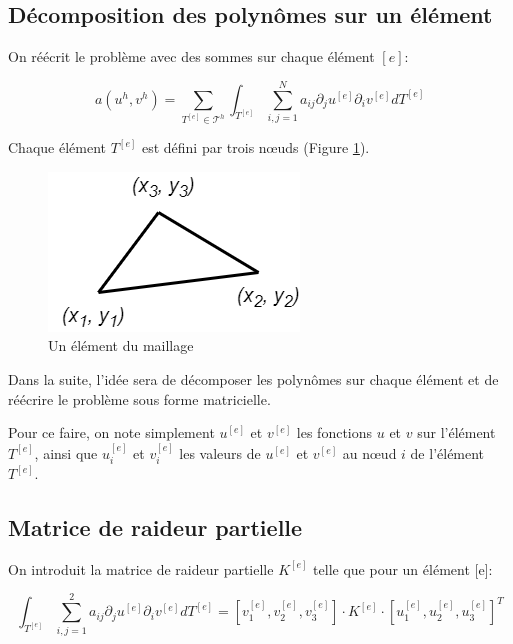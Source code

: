 \documentclass{article}
\begin{document}
\newpage

\subsection{Décomposition des polynômes sur un élément}

On réécrit le problème avec des sommes sur chaque élément $[e]$:

\begin{equation}
    a(u^h, v^h) = \sum_{T^{[e]} \in \mathcal{T}^h} \int_{T^{[e]}}
    \sum_{i,j=1}^N a_{ij} \partial_j u ^{[e]} \partial_i v^{[e]} dT^{[e]}
    \label{eq:general_problem}
\end{equation}

Chaque élément $T^{[e]}$ est défini par trois
nœuds (Figure \ref{fig:element}).

\begin{figure}[h]
    \centering
    \includegraphics[scale=0.5]{img/element.png}
    \caption{Un élément du maillage}
    \label{fig:element}
\end{figure}

Dans la suite, l'idée sera de décomposer les polynômes
sur chaque élément et de réécrire le problème sous forme
matricielle.

Pour ce faire, on note simplement $u^{[e]}$ et $v^{[e]}$
les fonctions $u$ et $v$ sur l'élément $T^{[e]}$, ainsi que
$u^{[e]}_i$ et $v^{[e]}_i$ les valeurs de $u^{[e]}$ et $v^{[e]}$
au nœud $i$ de l'élément $T^{[e]}$.

\subsection{Matrice de raideur partielle}

On introduit la matrice de raideur partielle
$K^{[e]}$ telle que pour un élément [e]:

\begin{equation}
    \int_{T^{[e]}} \sum_{i,j=1}^2 a_{ij} \partial_j u ^{[e]}
     \partial_i v^{[e]} dT^{[e]} 
     = \left[ v_1^{[e]}, v_2^{[e]},  v_3^{[e]} \right] \cdot K^{[e]}
     \cdot \left[ u_1^{[e]}, u_2^{[e]}, u_3^{[e]} \right]^T
    \label{eq:int_to_K}
\end{equation}
\end{document}
